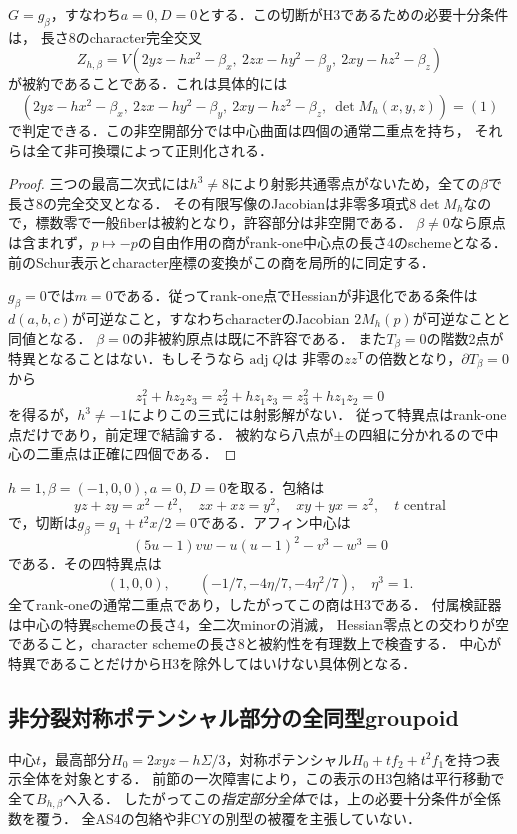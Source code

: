 \begin{corollary}[volume切断を全定数項で判定する]
\label{cor:beta-pure-volume}
$G=g_\beta$，すなわち$a=0,D=0$とする．この切断がH3であるための必要十分条件は，
長さ8のcharacter完全交叉
\[
 Z_{h,\beta}=V(2yz-hx^2-\beta_x,\ 2zx-hy^2-\beta_y,\ 2xy-hz^2-\beta_z)
\]
が被約であることである．これは具体的には
\[
 (2yz-hx^2-\beta_x,\ 2zx-hy^2-\beta_y,\ 2xy-hz^2-\beta_z,\ \det M_h(x,y,z))=(1)
\]
で判定できる．この非空開部分では中心曲面は四個の通常二重点を持ち，
それらは全て非可換環によって正則化される．
\end{corollary}
\begin{proof}
三つの最高二次式には$h^3\ne8$により射影共通零点がないため，全ての$\beta$で長さ8の完全交叉となる．
その有限写像のJacobianは非零多項式$8\det M_h$なので，標数零で一般fiberは被約となり，許容部分は非空開である．
$\beta\ne0$なら原点は含まれず，$p\mapsto-p$の自由作用の商がrank-one中心点の長さ4のschemeとなる．
前のSchur表示とcharacter座標の変換がこの商を局所的に同定する．

$g_\beta=0$では$m=0$である．従ってrank-one点でHessianが非退化である条件は
$d(a,b,c)$が可逆なこと，すなわちcharacterのJacobian $2M_h(p)$が可逆なことと同値となる．
$\beta=0$の非被約原点は既に不許容である．
また$T_\beta=0$の階数2点が特異となることはない．もしそうなら$\operatorname{adj}Q$は
非零の$zz^{\mathsf T}$の倍数となり，$\partial T_\beta=0$から
\[
 z_1^2+h z_2z_3=z_2^2+h z_1z_3=z_3^2+h z_1z_2=0
\]
を得るが，$h^3\ne-1$によりこの三式には射影解がない．
従って特異点はrank-one点だけであり，前定理で結論する．
被約なら八点が$\pm$の四組に分かれるので中心の二重点は正確に四個である．
\end{proof}

\begin{example}[特異中心を持つ明示的な非分裂H3]
\label{ex:beta-four-node-H3}
$h=1,\beta=(-1,0,0),a=0,D=0$を取る．包絡は
\[
 yz+zy=x^2-t^2,\quad zx+xz=y^2,\quad xy+yx=z^2,\quad t\text{ central}
\]
で，切断は$g_\beta=g_1+t^2x/2=0$である．アフィン中心は
\[
 (5u-1)vw-u(u-1)^2-v^3-w^3=0
\]
である．その四特異点は
\[
 (1,0,0),\qquad(-1/7,-4\eta/7,-4\eta^2/7),\quad\eta^3=1.
\]
全てrank-oneの通常二重点であり，したがってこの商はH3である．
付属検証器は中心の特異schemeの長さ4，全二次minorの消滅，
Hessian零点との交わりが空であること，character schemeの長さ8と被約性を有理数上で検査する．
中心が特異であることだけからH3を除外してはいけない具体例となる．
\end{example}

\subsection{非分裂対称ポテンシャル部分の全同型groupoid}
\label{sec:beta-global-groupoid}
中心$t$，最高部分$H_0=2xyz-h\Sigma/3$，対称ポテンシャル$H_0+tf_2+t^2f_1$を持つ表示全体を対象とする．
前節の一次障害により，この表示のH3包絡は平行移動で全て$B_{h,\beta}$へ入る．
したがってこの\emph{指定部分全体}では，上の必要十分条件が全係数を覆う．
全AS4の包絡や非CYの別型の被覆を主張していない．

